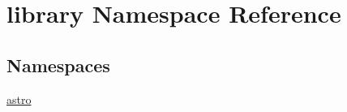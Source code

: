 \hypertarget{namespacelibrary}{}\section{library Namespace Reference}
\label{namespacelibrary}
\subsection*{Namespaces}
\begin{DoxyCompactItemize}
\item 
 \hyperlink{namespacelibrary_1_1astro}{astro}
\end{DoxyCompactItemize}
